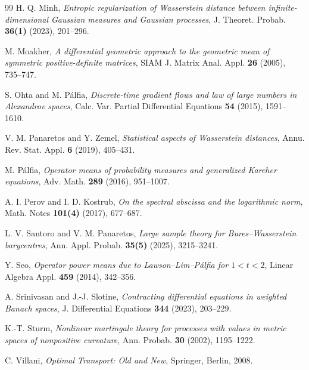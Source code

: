 \documentclass[12pt,reqno]{amsart}
\begin{document}
\begin{thebibliography}{99}
H. Q. Minh, \emph{Entropic regularization of Wasserstein distance between infinite-dimensional Gaussian measures and Gaussian processes}, J. Theoret. Probab. \textbf{36(1)} (2023), 201--296.

M. Moakher, \emph{A differential geometric approach to the geometric mean of symmetric positive-definite matrices}, SIAM J. Matrix Anal. Appl. \textbf{26} (2005), 735--747.

S. Ohta and M. P\'alfia, \emph{Discrete-time gradient flows and law of large numbers in Alexandrov spaces}, Calc. Var. Partial Differential Equations \textbf{54} (2015), 1591--1610.

V. M. Panaretos and Y. Zemel, \emph{Statistical aspects of Wasserstein distances}, Annu. Rev. Stat. Appl. \textbf{6} (2019), 405--431.

M. P\'alfia, \emph{Operator means of probability measures and generalized Karcher equations}, Adv. Math. \textbf{289} (2016), 951--1007.

A. I. Perov and I. D. Kostrub, \emph{On the spectral abscissa and the logarithmic norm}, Math. Notes \textbf{101(4)} (2017), 677--687.

L. V. Santoro and V. M. Panaretos, \emph{Large sample theory for Bures--Wasserstein barycentres}, Ann. Appl. Probab. \textbf{35(5)} (2025), 3215--3241.

Y. Seo, \emph{Operator power means due to Lawson--Lim--P\'alfia for $1<t<2$}, Linear Algebra Appl. \textbf{459} (2014), 342--356.

A. Srinivasan and J.-J. Slotine, \emph{Contracting differential equations in weighted Banach spaces}, J. Differential Equations \textbf{344} (2023), 203--229.

K.-T. Sturm, \emph{Nonlinear martingale theory for processes with values in metric spaces of nonpositive curvature}, Ann. Probab. \textbf{30} (2002), 1195--1222.

C. Villani, \emph{Optimal Transport: Old and New}, Springer, Berlin, 2008.




\end{thebibliography}
\end{document}
